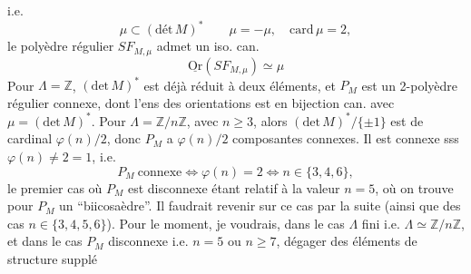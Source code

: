 i.e.
\[
\mu\subset(\mathrm{dét}\,M)^*\qquad\mu=-\mu,\quad\mathrm{card}\,\mu=2,
\]
le  polyèdre régulier $SF_{M,\mu}$ admet un iso. can.
\[
\underline{\mathrm{Or}}(SF_{M,\mu})\simeq\mu\tag*{(91)}
\]
Pour $\Lambda=\mathbb Z$, $(\mathrm{det}\,M)^*$ est déjà réduit à deux éléments, et  $P_M$ est un 2-polyèdre régulier connexe, dont l'ens des orientations est en bijection can. avec $\mu=(\mathrm{det}\,M)^*$. Pour $\Lambda=\mathbb Z/n\mathbb Z$, avec $n\geqslant3$, alors $(\mathrm{det}\,M)^*/\{\pm1\}$ est de cardinal $\varphi(n)/2$, donc $P_M$ a $\varphi(n)/2$ composantes connexes. Il est connexe sss $\varphi(n)\ne2=1$, i.e.
\[
P_M\ \text{connexe}\iff\varphi(n)=2\iff n\in\{3,4,6\},\tag*{(92)}
\]
le premier cas où $P_M$ est disconnexe étant relatif à la valeur $n=5$, où on trouve pour $P_M$ un ``biicosaèdre''. Il faudrait revenir sur ce cas par la suite (ainsi que   des cas $n\in\{3,4,5,6\}$). Pour le moment, je voudrais, dans le cas $\Lambda$ fini i.e. $\Lambda\simeq\mathbb Z/n\mathbb Z$, et dans le cas $P_M$ disconnexe i.e. $n=5$ ou $n\geqslant7$, dégager des éléments de structure supplé%
